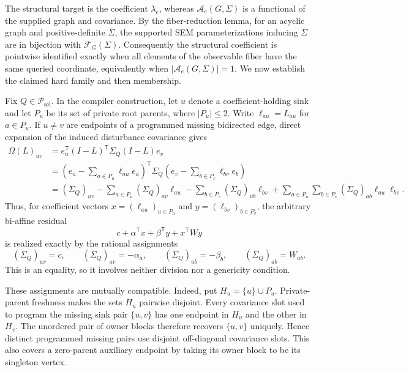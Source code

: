 The structural target is the coefficient \(\lambda_e\), whereas \(\mathcal A_e(G,\Sigma)\) is a functional of the supplied graph and covariance.  By the fiber-reduction lemma, for an acyclic graph and positive-definite \(\Sigma\), the supported SEM parameterizations inducing \(\Sigma\) are in bijection with \(\mathcal F_G(\Sigma)\).  Consequently the structural coefficient is pointwise identified exactly when all elements of the observable fiber have the same queried coordinate, equivalently when \(\lvert\mathcal A_e(G,\Sigma)\rvert=1\).  We now establish the claimed hard family and then membership.

Fix \(Q\in\mathcal P_{\mathrm{sel}}\).  In the compiler construction, let \(u\) denote a coefficient-holding sink and let \(P_u\) be its set of private root parents, where \(\lvert P_u\rvert\leq 2\).  Write \(\ell_{a u}=L_{a u}\) for \(a\in P_u\).  If \(u\neq v\) are endpoints of a programmed missing bidirected edge, direct expansion of the induced disturbance covariance gives
\[
\begin{aligned}
\Omega(L)_{uv}
&=e_u^{\mathsf T}(I-L)^{\mathsf T}\Sigma_Q(I-L)e_v\\
&=\left(e_u-\sum_{a\in P_u}\ell_{a u}e_a\right)^{\mathsf T}
  \Sigma_Q
  \left(e_v-\sum_{b\in P_v}\ell_{b v}e_b\right)\\
&=(\Sigma_Q)_{uv}
-\sum_{a\in P_u}(\Sigma_Q)_{av}\ell_{a u}
-\sum_{b\in P_v}(\Sigma_Q)_{ub}\ell_{b v}
+\sum_{a\in P_u}\sum_{b\in P_v}(\Sigma_Q)_{ab}\ell_{a u}\ell_{b v}.
\end{aligned}
\]
Thus, for coefficient vectors \(x=(\ell_{a u})_{a\in P_u}\) and \(y=(\ell_{b v})_{b\in P_v}\), the arbitrary bi-affine residual
\[
c+\alpha^{\mathsf T}x+\beta^{\mathsf T}y+x^{\mathsf T}Wy
\]
is realized exactly by the rational assignments
\[
(\Sigma_Q)_{uv}=c,\qquad
(\Sigma_Q)_{av}=-\alpha_a,\qquad
(\Sigma_Q)_{ub}=-\beta_b,\qquad
(\Sigma_Q)_{ab}=W_{ab}.
\]
This is an equality, so it involves neither division nor a genericity condition.

These assignments are mutually compatible.  Indeed, put \(H_u=\{u\}\cup P_u\).  Private-parent freshness makes the sets \(H_u\) pairwise disjoint.  Every covariance slot used to program the missing sink pair \(\{u,v\}\) has one endpoint in \(H_u\) and the other in \(H_v\).  The unordered pair of owner blocks therefore recovers \(\{u,v\}\) uniquely.  Hence distinct programmed missing pairs use disjoint off-diagonal covariance slots.  This also covers a zero-parent auxiliary endpoint by taking its owner block to be its singleton vertex.

